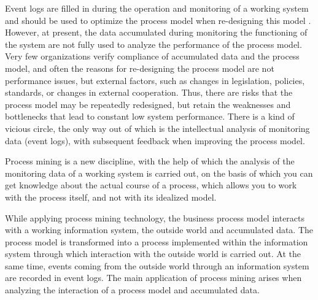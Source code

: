 \documentclass[
11pt,%
tightenlines,%
twoside,%
onecolumn,%
nofloats,%
nobibnotes,%
nofootinbib,%
superscriptaddress,%
noshowpacs,%
centertags]%
{revtex4}
\begin{document}
Event logs are filled in during the operation and monitoring of a working system and should be used to optimize the process model when re-designing this model \cite{Redesign}.
However, at present, the data accumulated during monitoring the functioning of the system are not fully used to analyze the performance of the process model.
Very few organizations verify compliance of accumulated data and the process model, and often the reasons for re-designing the process model are not performance issues, but external factors, such as changes in legislation, policies, standards, or changes in external cooperation.
Thus, there are risks that the process model may be repeatedly redesigned, but retain the weaknesses and bottlenecks that lead to constant low system performance.
There is a kind of vicious circle, the only way out of which is the intellectual analysis of monitoring data (event logs), with subsequent feedback when improving the process model.

Process mining is a new discipline, with the help of which the analysis of the monitoring data of a working system is carried out, on the basis of which you can get knowledge about the actual course of a process, which allows you to work with the process itself, and not with its idealized model.

While applying process mining technology, the business process model interacts with a working information system, the outside world and accumulated data.
The process model is transformed into a process implemented within the information system through which interaction with the outside world is carried out.
At the same time, events coming from the outside world through an information system are recorded in event logs.
The main application of process mining arises when analyzing the interaction of a process model and accumulated data.
\end{document}
